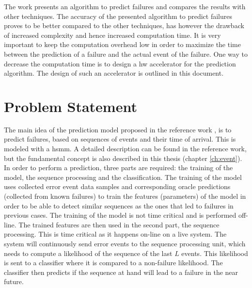 \documentclass[mscthesis]{usiinfthesis}
\begin{document}
The work \cite{salfner08} presents an algorithm to predict failures and
compares the results with other techniques. The accuracy of the presented
algorithm to predict failures proves to be better compared to the other
techniques, has however the drawback of increased complexity and hence
increased computation time. It is very important to keep the computation
overhead low in order to maximize the time between the prediction of a failure
and the actual event of the failure. One way to decrease the computation time
is to design a \gls{hw} accelerator for the prediction algorithm. The design of
such an accelerator is outlined in this document.

\section{Problem Statement}
\label{ch:_intro_prob}

The main idea of the prediction model proposed in the reference work
\cite{salfner08}, is to predict failures, based on sequences of events and
their time of arrival. This is modeled with a \gls{hsmm}. A detailed
description can be found in the reference work, but the fundamental concept is
also described in this thesis (chapter \ref{ch:event}). In order to perform
a prediction, three parts are required: the training of the model, the sequence
processing and the classification. The training of the model uses collected
error event data samples and corresponding oracle predictions (collected from
known failures) to train the features (parameters) of the model in order to be
able to detect similar sequences as the ones that led to failures in previous
cases. The training of the model is not time critical and is performed
off-line. The trained features are then used in the second part, the sequence
processing. This is time critical as it happens on-line on a live system. The
system will continuously send error events to the sequence processing unit,
which needs to compute a likelihood of the sequence of the last $L$ events.
This likelihood is sent to a classifier where it is compared to a non-failure
likelihood. The classifier then predicts if the sequence at hand will lead to
a failure in the near future.
\end{document}
